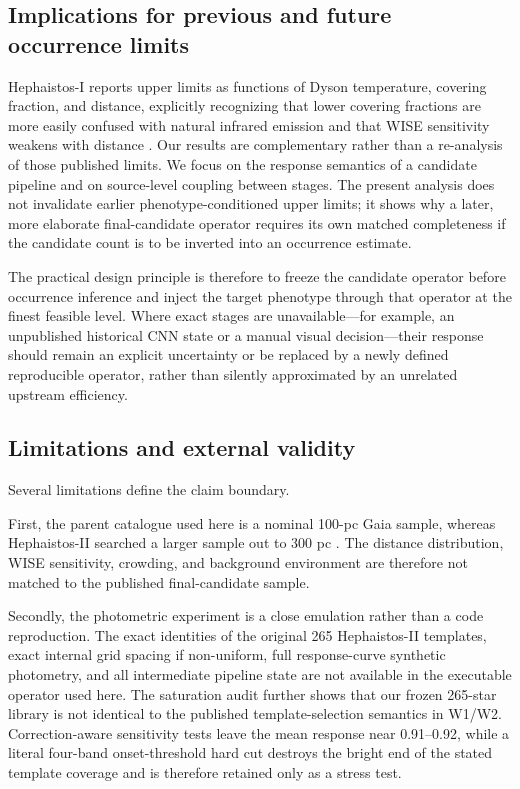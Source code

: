 \documentclass[fleqn,usenatbib]{mnras}
\begin{document}
\subsection{Implications for previous and future occurrence limits}

Hephaistos-I reports upper limits as functions of Dyson temperature, covering fraction, and distance, explicitly recognizing that lower covering fractions are more easily confused with natural infrared emission and that WISE sensitivity weakens with distance \citep{Suazo2022}. Our results are complementary rather than a re-analysis of those published limits. We focus on the response semantics of a candidate pipeline and on source-level coupling between stages. The present analysis does not invalidate earlier phenotype-conditioned upper limits; it shows why a later, more elaborate final-candidate operator requires its own matched completeness if the candidate count is to be inverted into an occurrence estimate.

The practical design principle is therefore to freeze the candidate operator before occurrence inference and inject the target phenotype through that operator at the finest feasible level. Where exact stages are unavailable---for example, an unpublished historical CNN state or a manual visual decision---their response should remain an explicit uncertainty or be replaced by a newly defined reproducible operator, rather than silently approximated by an unrelated upstream efficiency.

\subsection{Limitations and external validity}
\label{sec:limitations}

Several limitations define the claim boundary.

First, the parent catalogue used here is a nominal 100-pc Gaia sample, whereas Hephaistos-II searched a larger sample out to 300 pc \citep{Suazo2024}. The distance distribution, WISE sensitivity, crowding, and background environment are therefore not matched to the published final-candidate sample.

Secondly, the photometric experiment is a close emulation rather than a code reproduction. The exact identities of the original 265 Hephaistos-II templates, exact internal grid spacing if non-uniform, full response-curve synthetic photometry, and all intermediate pipeline state are not available in the executable operator used here. The saturation audit further shows that our frozen 265-star library is not identical to the published template-selection semantics in W1/W2. Correction-aware sensitivity tests leave the mean response near 0.91--0.92, while a literal four-band onset-threshold hard cut destroys the bright end of the stated template coverage and is therefore retained only as a stress test.
\end{document}
